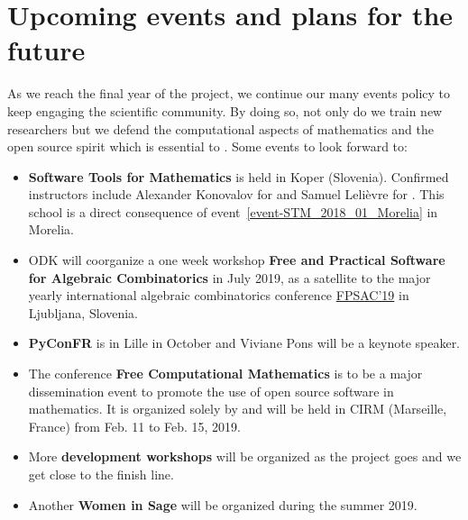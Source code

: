 \documentclass{deliverablereport}
\begin{document}






\section{Upcoming events and plans for the future}

As we reach the final year of the project, we continue our many events
policy to keep engaging the scientific community. By doing so,
not only do we train new researchers but we defend the computational aspects
of mathematics and the open source spirit which is essential to \ODK. 
Some events to look forward to:
\begin{itemize}
\item \textbf{Software Tools for Mathematics} is held in Koper (Slovenia). Confirmed
instructors include Alexander Konovalov for \GAP and Samuel Lelièvre for \Sage. This 
school is a direct consequence of event~\ref{event-STM_2018_01_Morelia} in Morelia.
\item ODK will coorganize a one week workshop \textbf{Free and
    Practical Software for Algebraic Combinatorics} in July 2019, as a
  satellite to the major yearly international algebraic combinatorics
  conference \href{http://fpsac2019.fmf.uni-lj.si/}{FPSAC'19} in
  Ljubljana, Slovenia.
\item \textbf{PyConFR} is in Lille in October and Viviane Pons will be a keynote speaker.
\item The conference \textbf{Free Computational Mathematics} is to be a major dissemination
event to promote the use of open source software in mathematics. It is organized solely by \ODK
and will be held in CIRM (Marseille, France) from Feb. 11 to Feb. 15, 2019.
\item More \textbf{development workshops} will be organized as the project goes and we get close
to the finish line.
\item Another \textbf{Women in Sage} will be organized during the summer 2019.
\end{itemize}


\newpage\printbibliography
\end{document}

